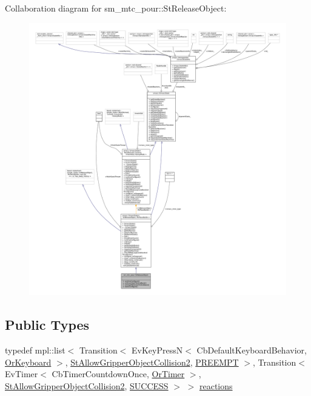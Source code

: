 Collaboration diagram for sm\+\_\+mtc\+\_\+pour\+:\+:St\+Release\+Object\+:
\nopagebreak
\begin{figure}[H]
\begin{center}
\leavevmode
\includegraphics[width=350pt]{structsm__mtc__pour_1_1StReleaseObject__coll__graph}
\end{center}
\end{figure}
\subsection*{Public Types}
\begin{DoxyCompactItemize}
\item 
typedef mpl\+::list$<$ Transition$<$ Ev\+Key\+PressN$<$ Cb\+Default\+Keyboard\+Behavior, \hyperlink{classsm__mtc__pour_1_1OrKeyboard}{Or\+Keyboard} $>$, \hyperlink{structsm__mtc__pour_1_1StAllowGripperObjectCollision2}{St\+Allow\+Gripper\+Object\+Collision2}, \hyperlink{classPREEMPT}{P\+R\+E\+E\+M\+PT} $>$, Transition$<$ Ev\+Timer$<$ Cb\+Timer\+Countdown\+Once, \hyperlink{classsm__mtc__pour_1_1OrTimer}{Or\+Timer} $>$, \hyperlink{structsm__mtc__pour_1_1StAllowGripperObjectCollision2}{St\+Allow\+Gripper\+Object\+Collision2}, \hyperlink{classSUCCESS}{S\+U\+C\+C\+E\+SS} $>$ $>$ \hyperlink{structsm__mtc__pour_1_1StReleaseObject_ae38e5b2fc1d07ea40b33d36f784bb0ae}{reactions}
\end{DoxyCompactItemize}
